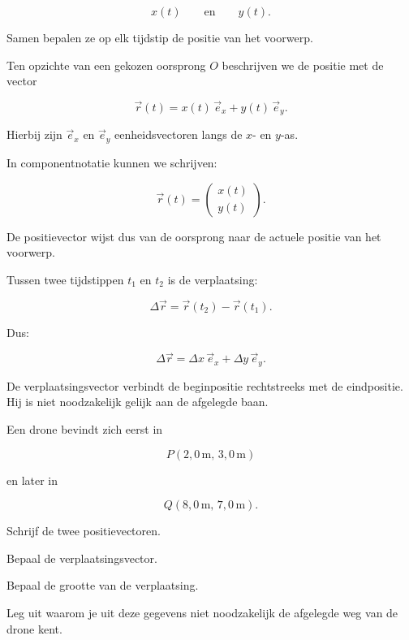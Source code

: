 \documentclass{ximera}
\begin{document}
\[
x(t)
\qquad\text{en}\qquad
y(t).
\]

Samen bepalen ze op elk tijdstip de positie van het voorwerp.



Ten opzichte van een gekozen oorsprong $O$ beschrijven we de positie
met de vector

\[
\boxed{
\vec r(t)=x(t)\,\vec e_x+y(t)\,\vec e_y.
}
\]

Hierbij zijn $\vec e_x$ en $\vec e_y$ eenheidsvectoren langs de
$x$- en $y$-as.

In componentnotatie kunnen we schrijven:

\[
\vec r(t)=
\begin{pmatrix}
x(t)\\
y(t)
\end{pmatrix}.
\]

De positievector wijst dus van de oorsprong naar de actuele positie
van het voorwerp.



Tussen twee tijdstippen $t_1$ en $t_2$ is de verplaatsing:

\[
\boxed{
\Delta\vec r
=
\vec r(t_2)-\vec r(t_1).
}
\]

Dus:

\[
\Delta\vec r
=
\Delta x\,\vec e_x+\Delta y\,\vec e_y.
\]

De verplaatsingsvector verbindt de beginpositie rechtstreeks met de
eindpositie. Hij is niet noodzakelijk gelijk aan de afgelegde baan.


\begin{oefening}{\oefB\ESS}

Een drone bevindt zich eerst in

\[
P(2,0\,\mathrm{m},\,3,0\,\mathrm{m})
\]

en later in

\[
Q(8,0\,\mathrm{m},\,7,0\,\mathrm{m}).
\]

\begin{question}
Schrijf de twee positievectoren.
\end{question}

\begin{question}
Bepaal de verplaatsingsvector.
\end{question}

\begin{question}
Bepaal de grootte van de verplaatsing.
\end{question}

\begin{question}
Leg uit waarom je uit deze gegevens niet noodzakelijk de afgelegde weg
van de drone kent.
\end{question}

\end{oefening}
\end{document}
